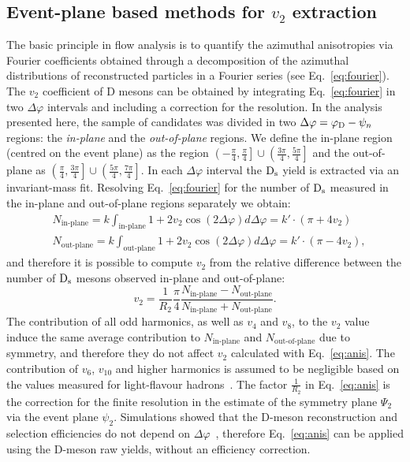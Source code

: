 \subsection{Event-plane based methods for $v_2$ extraction} 
\label{sec:epMethodsDescript}
The basic principle in flow analysis is to quantify the azimuthal 
anisotropies via Fourier coefficients obtained through a 
decomposition of the azimuthal distributions of reconstructed particles in a Fourier series (see Eq.~\ref{eq:fourier}).
The $v_2$ coefficient of D mesons can be obtained by integrating Eq.~\ref{eq:fourier}
in two $\Delta \varphi$ intervals and including a correction for the
resolution. In the analysis presented here, the sample of candidates was 
divided in two $\Delta\varphi = \varphi_{\rm D}-\psi_n$ regions: the \textit{in-plane} 
and the \textit{out-of-plane} regions. We define the in-plane 
region (centred on the event plane) as the region 
$\left(-\frac{\pi}{4},\frac{\pi}{4}\right]\cup\left(\frac{3\pi}{4},\frac{5\pi}{4}\right]$ and
 the out-of-plane as $\left(\frac{\pi}{4},\frac{3\pi}{4}\right]\cup\left(\frac{5\pi}{4},\frac{7\pi}{4}\right]$. 
 In each $\Delta\varphi$ interval the ${\rm D_s}$ yield is extracted via
an invariant-mass fit. Resolving Eq.~\ref{eq:fourier} for the number of ${\rm D_s}$ measured 
 in the in-plane and out-of-plane regions separately we obtain:
\begin{equation}\label{eq:ninout}
 \begin{split}
  & N_\text{in-plane} = k\int_\text{in-plane}1+2v_2\cos(2\Delta \varphi)d\Delta \varphi = k'\cdot(\pi+4v_2)\\
  & N_\text{out-plane} = k\int_\text{out-plane}1+2v_2\cos(2\Delta \varphi)d\Delta \varphi= k'\cdot(\pi-4v_2),
 \end{split}
\end{equation}
and therefore it is possible to compute $v_2$ from the relative 
difference between the number of ${\rm D_s}$ mesons observed in-plane and out-of-plane:
\begin{equation}
\label{eq:anis}
 v_2 = \frac{1}{R_2} \frac{\pi}{4}\frac{N_\text{in-plane}-N_\text{out-plane}}{N_\text{in-plane}+N_\text{out-plane}}.
\end{equation}
The contribution of all odd harmonics, 
as well as $v_4$ and $v_8$, to the $v_2$ value induce the same average 
contribution to $N_\text{in-plane}$ and $N_\text{out-of-plane}$ 
due to symmetry, and therefore they do not affect $v_2$ calculated with 
Eq.~\ref{eq:anis}. The contribution of $v_6$, $v_{10}$ and higher 
harmonics is assumed to be negligible based on the 
values measured for light-flavour hadrons~\cite{Aamodt:2011by,ATLAS:2012at}.
The factor $\frac{1}{R_2}$ in Eq.~\ref{eq:anis} is the correction for the finite resolution in the
estimate of the symmetry plane $\Psi_2$ via the event plane $\psi_2$.
 Simulations showed that the D-meson reconstruction 
 and selection efficiencies do not depend on $\Delta\varphi$~\cite{Abelev:2014ipa}, 
therefore Eq.~\ref{eq:anis} can be applied using the 
D-meson raw yields, without an efficiency correction.

